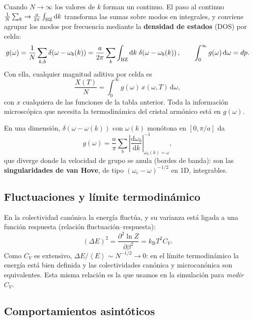 \documentclass[11pt,a4paper]{article}
\newcommand{\kB}{k_{\mathrm B}}
\newcommand{\dd}{\mathrm{d}}
\newcommand{\avg}[1]{\left\langle #1\right\rangle}
\begin{document}
Cuando $N\to\infty$ los valores de $k$ forman un continuo. El paso al continuo
$\frac1N\sum_k\to\frac{a}{2\pi}\int_{\rm BZ}\dd k$ transforma las sumas sobre
modos en integrales, y conviene agrupar los modos por frecuencia mediante la
\textbf{densidad de estados} (DOS) por celda:
\begin{equation}
g(\omega)=\frac1N\sum_{k,b}\delta\!\left(\omega-\omega_b(k)\right)
=\frac{a}{2\pi}\sum_b\int_{\rm BZ}\dd k\;\delta\!\left(\omega-\omega_b(k)\right),
\qquad \int_0^\infty g(\omega)\,\dd\omega = dp .
\end{equation}
Con ella, cualquier magnitud aditiva por celda es
\begin{equation}
\frac{X(T)}{N}=\int_0^\infty g(\omega)\,x(\omega,T)\,\dd\omega ,
\label{eq:dosint}
\end{equation}
con $x$ cualquiera de las funciones de la tabla anterior. Toda la información
microscópica que necesita la termodinámica del cristal armónico está en
$g(\omega)$.

En una dimensión, $\delta(\omega-\omega(k))$ con $\omega(k)$ monótona en
$[0,\pi/a]$ da
\begin{equation}
g(\omega)=\frac{a}{\pi}\sum_b\left|\frac{\dd\omega_b}{\dd k}\right|^{-1}_{\omega_b(k)=\omega},
\end{equation}
que diverge donde la velocidad de grupo se anula (bordes de banda): son las
\textbf{singularidades de van Hove}, de tipo $(\omega_c-\omega)^{-1/2}$ en 1D,
integrables.

\subsection{Fluctuaciones y límite termodinámico}\label{sec:fluct}

En la colectividad canónica la energía fluctúa, y su varianza está ligada a una
función respuesta (relación fluctuación–respuesta):
\begin{equation}
(\Delta E)^2=\frac{\partial^2\ln Z}{\partial\beta^2}=\kB T^2C_V .
\end{equation}
Como $C_V$ es extensivo, $\Delta E/\avg E\sim N^{-1/2}\to0$: en el límite
termodinámico la energía está bien definida y las colectividades canónica y
microcanónica son equivalentes. Esta misma relación es la que usamos en la
simulación para \emph{medir} $C_V$.

\subsection{Comportamientos asintóticos}
\end{document}
